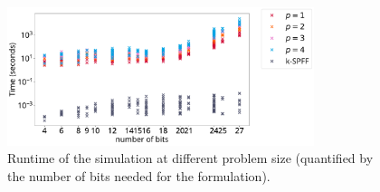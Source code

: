 
\begin{figure}[H]
  \begin{center}
	\includegraphics[width=0.8\textwidth]{pictures/plots/time/time.pdf}
  \end{center}
	\caption{
	Runtime of the simulation at different problem size (quantified by the number of bits needed for the formulation).
      }
	\label{fig:runtime}
\end{figure}
